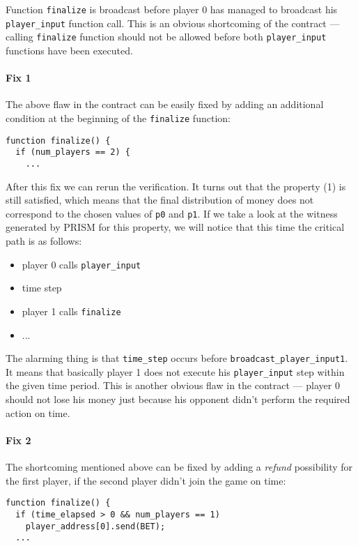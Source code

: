 Function \lstinline{finalize} is broadcast before player 0 has managed to broadcast his \lstinline{player_input} 
function call.
This is an obvious shortcoming of the contract --- calling \lstinline{finalize} function should not be allowed
before both \lstinline{player_input} functions have been executed.

\paragraph{Fix 1} 

The above flaw in the contract can be easily fixed by adding an additional condition at the beginning of the 
\lstinline{finalize} function:
\begin{lstlisting}
function finalize() {
  if (num_players == 2) {
    ...
\end{lstlisting}

After this fix we can rerun the verification.
It turns out that the property (1) is still satisfied, which means that the final distribution of money does not correspond
to the chosen values of \lstinline{p0} and \lstinline{p1}.
If we take a look at the witness generated by PRISM for this property, we will notice that this time
the critical path is as follows:
\begin{itemize}
\item player 0 calls \lstinline{player_input}
\item time step
\item player 1 calls \lstinline{finalize}
\item ...
\end{itemize}
The alarming thing is that \lstinline{time_step} occurs before \lstinline{broadcast_player_input1}.
It means that basically player 1 does not execute his \lstinline{player_input} step within the given time period.
This is another obvious flaw in the contract --- player 0 should not lose his money just because his opponent
didn't perform the required action on time.

\paragraph{Fix 2}

The shortcoming mentioned above can be fixed by adding a \emph{refund} possibility for the first player, if the second player
didn't join the game on time:
\begin{lstlisting}
function finalize() {
  if (time_elapsed > 0 && num_players == 1)
    player_address[0].send(BET);
  ...
\end{lstlisting}

